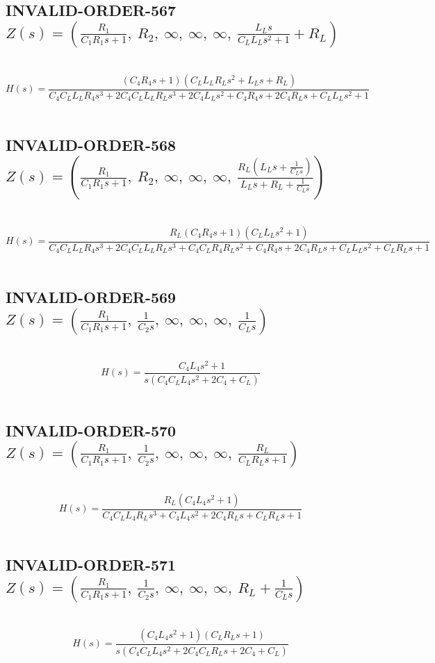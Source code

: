 \documentclass{article}
\begin{document}
\subsection{INVALID-ORDER-567 $Z(s) = \left( \frac{R_{1}}{C_{1} R_{1} s + 1}, \  R_{2}, \  \infty, \  \infty, \  \infty, \  \frac{L_{L} s}{C_{L} L_{L} s^{2} + 1} + R_{L}\right)$ } \ 
\textbf{\[H(s) = \frac{\left(C_{4} R_{4} s + 1\right) \left(C_{L} L_{L} R_{L} s^{2} + L_{L} s + R_{L}\right)}{C_{4} C_{L} L_{L} R_{4} s^{3} + 2 C_{4} C_{L} L_{L} R_{L} s^{3} + 2 C_{4} L_{L} s^{2} + C_{4} R_{4} s + 2 C_{4} R_{L} s + C_{L} L_{L} s^{2} + 1}\] } \ 
\subsection{INVALID-ORDER-568 $Z(s) = \left( \frac{R_{1}}{C_{1} R_{1} s + 1}, \  R_{2}, \  \infty, \  \infty, \  \infty, \  \frac{R_{L} \left(L_{L} s + \frac{1}{C_{L} s}\right)}{L_{L} s + R_{L} + \frac{1}{C_{L} s}}\right)$ } \ 
\textbf{\[H(s) = \frac{R_{L} \left(C_{4} R_{4} s + 1\right) \left(C_{L} L_{L} s^{2} + 1\right)}{C_{4} C_{L} L_{L} R_{4} s^{3} + 2 C_{4} C_{L} L_{L} R_{L} s^{3} + C_{4} C_{L} R_{4} R_{L} s^{2} + C_{4} R_{4} s + 2 C_{4} R_{L} s + C_{L} L_{L} s^{2} + C_{L} R_{L} s + 1}\] } \ 
\subsection{INVALID-ORDER-569 $Z(s) = \left( \frac{R_{1}}{C_{1} R_{1} s + 1}, \  \frac{1}{C_{2} s}, \  \infty, \  \infty, \  \infty, \  \frac{1}{C_{L} s}\right)$ } \ 
\textbf{\[H(s) = \frac{C_{4} L_{4} s^{2} + 1}{s \left(C_{4} C_{L} L_{4} s^{2} + 2 C_{4} + C_{L}\right)}\] } \ 
\subsection{INVALID-ORDER-570 $Z(s) = \left( \frac{R_{1}}{C_{1} R_{1} s + 1}, \  \frac{1}{C_{2} s}, \  \infty, \  \infty, \  \infty, \  \frac{R_{L}}{C_{L} R_{L} s + 1}\right)$ } \ 
\textbf{\[H(s) = \frac{R_{L} \left(C_{4} L_{4} s^{2} + 1\right)}{C_{4} C_{L} L_{4} R_{L} s^{3} + C_{4} L_{4} s^{2} + 2 C_{4} R_{L} s + C_{L} R_{L} s + 1}\] } \ 
\subsection{INVALID-ORDER-571 $Z(s) = \left( \frac{R_{1}}{C_{1} R_{1} s + 1}, \  \frac{1}{C_{2} s}, \  \infty, \  \infty, \  \infty, \  R_{L} + \frac{1}{C_{L} s}\right)$ } \ 
\textbf{\[H(s) = \frac{\left(C_{4} L_{4} s^{2} + 1\right) \left(C_{L} R_{L} s + 1\right)}{s \left(C_{4} C_{L} L_{4} s^{2} + 2 C_{4} C_{L} R_{L} s + 2 C_{4} + C_{L}\right)}\] } \ 
\end{document}
